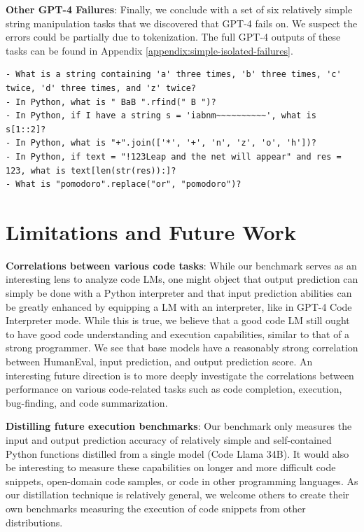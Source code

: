 \documentclass{article}
\begin{document}
\textbf{Other GPT-4 Failures}: Finally, we conclude with a set of six relatively simple string manipulation tasks that we discovered that GPT-4 fails on. We suspect the errors could be partially due to tokenization.
The full GPT-4 outputs of these tasks can be found in Appendix \ref{appendix:simple-isolated-failures}.

\begin{lstlisting}
- What is a string containing 'a' three times, 'b' three times, 'c' twice, 'd' three times, and 'z' twice?
- In Python, what is " BaB ".rfind(" B ")?
- In Python, if I have a string s = 'iabnm~~~~~~~~~~', what is s[1::2]?
- In Python, what is "+".join(['*', '+', 'n', 'z', 'o', 'h'])?
- In Python, if text = "!123Leap and the net will appear" and res = 123, what is text[len(str(res)):]?
- What is "pomodoro".replace("or", "pomodoro")?
\end{lstlisting}




\section{Limitations and Future Work} \label{sec:limitations-future-work}

\textbf{Correlations between various code tasks}: While our benchmark serves as an interesting lens to analyze code LMs, one might object that output prediction can simply be done with a Python interpreter and that input prediction abilities can be greatly enhanced by equipping a LM with an interpreter, like in GPT-4 Code Interpreter mode. While this is true, we believe that a good code LM still ought to have good code understanding and execution capabilities, similar to that of a strong programmer. We see that base models have a reasonably strong correlation between HumanEval, input prediction, and output prediction score. An interesting future direction is to more deeply investigate the correlations between performance on various code-related tasks such as code completion, execution, bug-finding, and code summarization.

\textbf{Distilling future execution benchmarks}: Our benchmark only measures the input and output prediction accuracy of relatively simple and self-contained Python functions distilled from a single model (Code Llama 34B). It would also be interesting to measure these capabilities on longer and more difficult code snippets, open-domain code samples, or code in other programming languages. As our distillation technique is relatively general, we welcome others to create their own benchmarks measuring the execution of code snippets from other distributions.
\end{document}
